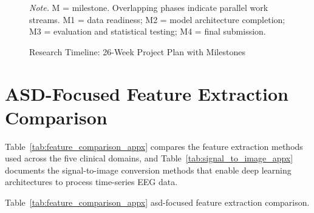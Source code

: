 \begin{figure}[!htbp]
{%
    }%
    \caption{Research Timeline: 26-Week Project Plan with Milestones}
    \label{fig:research_timeline_appx}
    \vspace{0.5em}\noindent\textit{Note.} M = milestone. Overlapping phases indicate parallel work streams. M1 = data readiness; M2 = model architecture completion; M3 = evaluation and statistical testing; M4 = final submission.
\end{figure}


\section{ASD-Focused Feature Extraction Comparison}
\label{sec:appx_feature_extraction}

Table~\ref{tab:feature_comparison_appx} compares the feature extraction methods used across the five clinical domains, and Table~\ref{tab:signal_to_image_appx} documents the signal-to-image conversion methods that enable deep learning architectures to process time-series EEG data.

\iffalse %
\noindent Table~\ref{tab:feature_comparison_appx} asd-focused feature extraction comparison.

